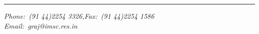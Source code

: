 \vfill

\hrule
\begin{flushleft}
{\sl Phone:~(91 44)2254 3326,\hfill Fax:~(91 44)2254 1586}\\[5pt]
{\sl Email:~graj@imsc.res.in} 
\end{flushleft}

%



